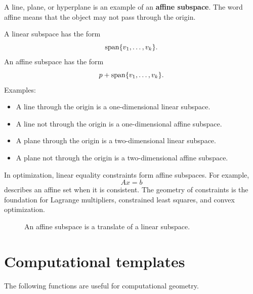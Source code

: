 A line, plane, or hyperplane is an example of an \textbf{affine subspace}. The word affine means that the object may not pass through the origin.

A linear subspace has the form
\[
  \operatorname{span}\{v_1,\ldots,v_k\}.
\]
An affine subspace has the form
\[
  p+\operatorname{span}\{v_1,\ldots,v_k\}.
\]
Examples:
\begin{itemize}
\item A line through the origin is a one-dimensional linear subspace.
\item A line not through the origin is a one-dimensional affine subspace.
\item A plane through the origin is a two-dimensional linear subspace.
\item A plane not through the origin is a two-dimensional affine subspace.
\end{itemize}
In optimization, linear equality constraints form affine subspaces. For example,
\[
  Ax=b
\]
describes an affine set when it is consistent. The geometry of constraints is the foundation for Lagrange multipliers, constrained least squares, and convex optimization.

\begin{figure}[H]
\centering
{}
\caption{An affine subspace is a translate of a linear subspace.}
\end{figure}

\section{Computational templates}

The following functions are useful for computational geometry.


